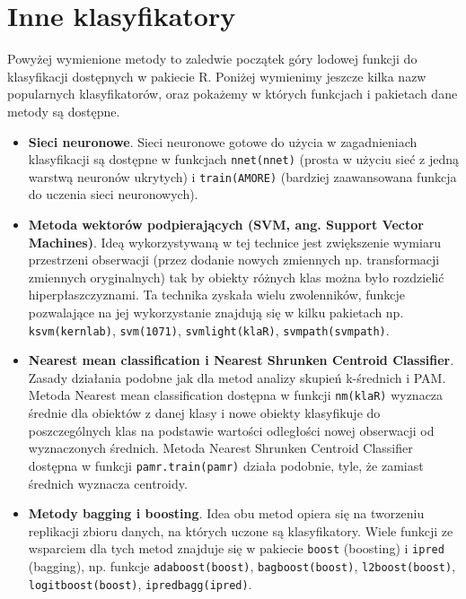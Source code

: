\documentclass[polish,]{book}
\begin{document}
\hypertarget{part_46}{%
\section{Inne klasyfikatory}\label{part_46}}

Powyżej wymienione metody to zaledwie początek góry lodowej funkcji do klasyfikacji dostępnych w pakiecie R. Poniżej wymienimy jeszcze kilka nazw popularnych
klasyfikatorów, oraz pokażemy w których funkcjach i pakietach dane metody są dostępne.

\begin{itemize}
\item
  \textbf{Sieci neuronowe}.
  Sieci neuronowe gotowe do użycia w zagadnieniach klasyfikacji są dostępne
  w funkcjach \texttt{nnet(nnet)} (prosta w użyciu sieć z jedną warstwą neuronów
  ukrytych) i \texttt{train(AMORE)} (bardziej zaawansowana funkcja do uczenia sieci
  neuronowych).
\item
  \textbf{Metoda wektorów podpierających (SVM, ang. Support Vector Machines)}.
  Ideą wykorzystywaną w tej technice jest zwiększenie wymiaru przestrzeni obserwacji (przez dodanie nowych zmiennych np. transformacji zmiennych oryginalnych) tak by obiekty różnych klas można było rozdzielić hiperpłaszczyznami. Ta technika zyskała wielu zwolenników, funkcje pozwalające na jej wykorzystanie znajdują się w kilku pakietach np. \texttt{ksvm(kernlab)}, \texttt{svm(1071)},
  \texttt{svmlight(klaR)}, \texttt{svmpath(svmpath)}.
\item
  \textbf{Nearest mean classification i Nearest Shrunken Centroid Classifier}.
  Zasady działania podobne jak dla metod analizy skupień k-średnich i PAM.
  Metoda Nearest mean classification dostępna w funkcji \texttt{nm(klaR)} wyznacza
  średnie dla obiektów z danej klasy i nowe obiekty klasyfikuje do poszczególnych klas na podstawie wartości odległości nowej obserwacji od wyznaczonych
  średnich. Metoda Nearest Shrunken Centroid Classifier dostępna w funkcji
  \texttt{pamr.train(pamr)} działa podobnie, tyle, że zamiast średnich wyznacza centroidy.
\item
  \textbf{Metody bagging i boosting}.
  Idea obu metod opiera się na tworzeniu replikacji zbioru danych, na których
  uczone są klasyfikatory. Wiele funkcji ze wsparciem dla tych metod znajduje się
  w pakiecie \texttt{boost} (boosting) i \texttt{ipred} (bagging), np. funkcje \texttt{adaboost(boost)},
  \texttt{bagboost(boost)}, \texttt{l2boost(boost)}, \texttt{logitboost(boost)}, \texttt{ipredbagg(ipred)}.
\end{itemize}
\end{document}

